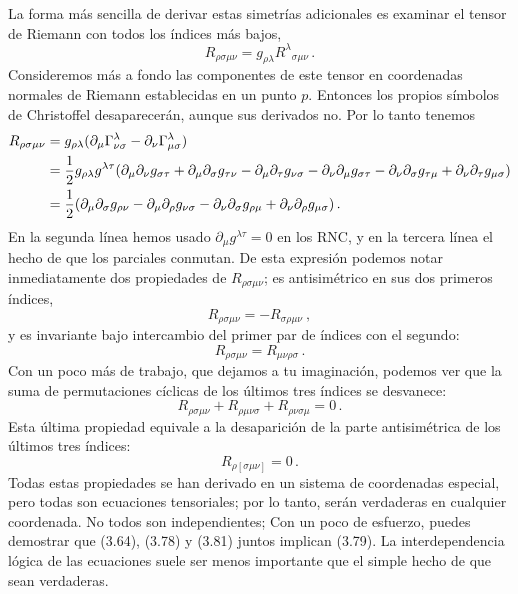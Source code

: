 \documentclass[11pt,b5paper,openany,twoside]{book}
\newcommand{\mn}{{\mu\nu}}
\newcommand{\p}[1]{{\partial_{#1}}}
\begin{document}
La forma más sencilla de derivar estas simetrías adicionales es examinar el tensor de Riemann con todos los índices más bajos,
\begin{equation}
R_{\rho\sigma\mn} = g_{\rho\lambda}R^\lambda{}_{\sigma\mn}\,.
\label{3.76}
\end{equation}
Consideremos más a fondo las componentes de este tensor en coordenadas normales de Riemann establecidas en un punto $p$.
Entonces los propios símbolos de Christoffel desaparecerán, aunque sus derivados no.
Por lo tanto tenemos
\begin{align}
R_{\rho\sigma\mn} &=  g_{\rho\lambda}
(\p\mu\Gamma^\lambda_{\nu\sigma}- \p\nu
\Gamma^\lambda_{\mu\sigma}) \notag \\
&=  {1\over 2}g_{\rho\lambda}g^{\lambda\tau}(
\p\mu\p\nu g_{\sigma\tau} + \p\mu\p\sigma g_{\tau\nu}
-\p\mu\p\tau g_{\nu\sigma} - \p\nu\p\mu g_{\sigma\tau}
- \p\nu\p\sigma g_{\tau\mu}+\p\nu\p\tau g_{\mu\sigma}) \notag \\
&= {1\over 2}(\p\mu\p\sigma g_{\rho\nu}
-\p\mu\p\rho g_{\nu\sigma} - \p\nu\p\sigma g_{\rho\mu}
+\p\nu\p\rho g_{\mu\sigma})\,. \label{3.77}
\end{align}
En la segunda línea hemos usado $\partial_\mu g^{\lambda\tau}=0$ en los RNC, y en la tercera línea el hecho de que los parciales conmutan.
De esta expresión podemos notar inmediatamente dos propiedades de $R_{\rho\sigma\mn}$; es antisimétrico en sus dos primeros índices,
\begin{equation}
R_{\rho\sigma\mn}=-R_{\sigma\rho\mn}\ ,\label{3.78}
\end{equation}
y es invariante bajo intercambio del primer par de índices con el segundo:
\begin{equation}
R_{\rho\sigma\mn}= R_{\mn\rho\sigma}\,.\label{3.79}
\end{equation}
Con un poco más de trabajo, que dejamos a tu imaginación, podemos ver que la suma de permutaciones cíclicas de los últimos tres índices se desvanece:
\begin{equation}
R_{\rho\sigma\mn} + R_{\rho\mn\sigma} + R_{\rho\nu\sigma\mu}
=0 \,.\label{3.80}
\end{equation}
Esta última propiedad equivale a la desaparición de la parte antisimétrica de los últimos tres índices:
\begin{equation}
R_{\rho[\sigma\mn]} =0 \,.\label{3.81}
\end{equation}
Todas estas propiedades se han derivado en un sistema de coordenadas especial, pero todas son ecuaciones tensoriales; por lo tanto, serán verdaderas en cualquier coordenada.
No todos son independientes; Con un poco de esfuerzo, puedes demostrar que (3.64), (3.78) y (3.81) juntos implican (3.79).
La interdependencia lógica de las ecuaciones suele ser menos importante que el simple hecho de que sean verdaderas.
\end{document}
